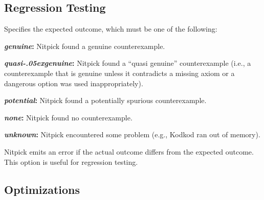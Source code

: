 \documentclass[a4paper,12pt]{article}
\renewcommand\_{\hbox{\textunderscore\kern-.05ex}}
\begin{document}
\subsection{Regression Testing}
\label{regression-testing}

\begin{enum}
Specifies the expected outcome, which must be one of the following:

\begin{enum}
\item[\labelitemi] \textbf{\textit{genuine}:} Nitpick found a genuine counterexample.
\item[\labelitemi] \textbf{\textit{quasi\_genuine}:} Nitpick found a ``quasi
genuine'' counterexample (i.e., a counterexample that is genuine unless
it contradicts a missing axiom or a dangerous option was used inappropriately).
\item[\labelitemi] \textbf{\textit{potential}:} Nitpick found a potentially
spurious counterexample.
\item[\labelitemi] \textbf{\textit{none}:} Nitpick found no counterexample.
\item[\labelitemi] \textbf{\textit{unknown}:} Nitpick encountered some problem (e.g.,
Kodkod ran out of memory).
\end{enum}

Nitpick emits an error if the actual outcome differs from the expected outcome.
This option is useful for regression testing.
\end{enum}

\subsection{Optimizations}
\label{optimizations}

\def\cpp{C\nobreak\raisebox{.1ex}{+}\nobreak\raisebox{.1ex}{+}}

\sloppy
\end{document}
